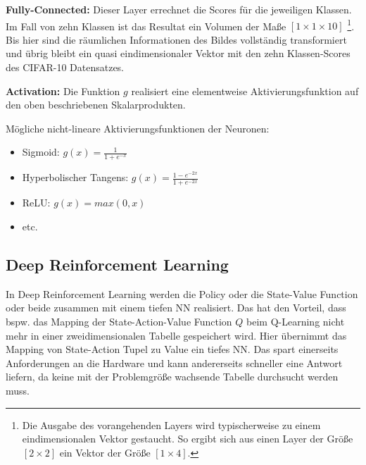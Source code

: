 \textbf{Fully-Connected:} Dieser Layer errechnet die Scores für die jeweiligen Klassen. Im Fall von zehn Klassen ist das Resultat ein Volumen der Maße $[1 \times 1 \times 10]$ \footnote{Die Ausgabe des vorangehenden Layers wird typischerweise zu einem eindimensionalen Vektor gestaucht. So ergibt sich aus einen Layer der Größe $[2 \times 2]$ ein Vektor der Größe $[1 \times 4]$.}. Bis hier sind die räumlichen Informationen des Bildes vollständig transformiert und übrig bleibt ein quasi eindimensionaler Vektor mit den zehn Klassen-Scores des CIFAR-10 Datensatzes.

\textbf{Activation:} Die Funktion $g$ realisiert eine elementweise Aktivierungsfunktion auf den oben beschriebenen Skalarprodukten. 

Mögliche nicht-lineare Aktivierungsfunktionen der Neuronen: 
  \begin{itemize}
  	\item Sigmoid: $g(x) = \frac{1}{1+e^{-x}}$
  	\item Hyperbolischer Tangens: $g(x) = \frac{1- e^{-2x}}{1+e^{-2x}}$
  	\item ReLU: $g(x) = max(0,x)$ 
  	\item etc.
\end{itemize}






\subsection{Deep Reinforcement Learning}\label{absch_RL_deepRL}
In Deep Reinforcement Learning werden die Policy oder die State-Value Function oder beide zusammen mit einem tiefen NN realisiert. Das hat den Vorteil, dass bspw. das Mapping der State-Action-Value Function $Q$ beim Q-Learning nicht mehr in einer zweidimensionalen Tabelle gespeichert wird. Hier übernimmt das Mapping von State-Action Tupel zu Value ein tiefes NN. Das spart einerseits Anforderungen an die Hardware und kann andererseits schneller eine Antwort liefern, da keine mit der Problemgröße wachsende Tabelle durchsucht werden muss. 

